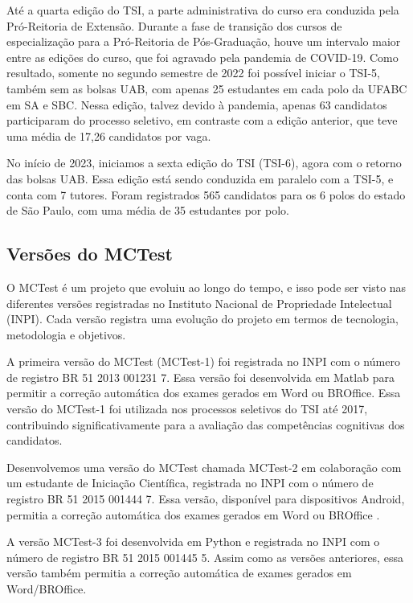 Até a quarta edição do TSI, a parte administrativa do curso era conduzida pela Pró-Reitoria de Extensão. Durante a fase de transição dos cursos de especialização para a Pró-Reitoria de Pós-Graduação, houve um intervalo maior entre as edições do curso, que foi agravado pela pandemia de COVID-19. Como resultado, somente no segundo semestre de 2022 foi possível iniciar o TSI-5, também sem as bolsas UAB, com apenas 25 estudantes em cada polo da UFABC em SA e SBC. Nessa edição, talvez devido à pandemia, apenas 63 candidatos participaram do processo seletivo, em contraste com a edição anterior, que teve uma média de 17,26 candidatos por vaga.

No início de 2023, iniciamos a sexta edição do TSI (TSI-6), agora com o retorno das bolsas UAB. Essa edição está sendo conduzida em paralelo com a TSI-5, e conta com 7 tutores. %
Foram registrados 565 candidatos para os 6 polos do estado de São Paulo, com uma média de 35 estudantes por polo.

\subsection{Versões do MCTest}\label{sec:registrosSoftware}

O MCTest é um projeto que evoluiu ao longo do tempo, e isso pode ser visto nas diferentes versões registradas no Instituto Nacional de Propriedade Intelectual (INPI). Cada versão registra uma evolução do projeto em termos de tecnologia, metodologia e objetivos.

A primeira versão do MCTest (MCTest-1) foi registrada no INPI com o número de registro BR 51 2013 001231 7. Essa versão foi desenvolvida em Matlab para permitir a correção automática dos exames gerados em Word ou BROffice. Essa versão do MCTest-1 foi utilizada nos processos seletivos do TSI até 2017, contribuindo significativamente para a avaliação das competências cognitivas dos candidatos.

Desenvolvemos uma versão do MCTest chamada MCTest-2 em colaboração com um estudante de Iniciação Científica, registrada no INPI com o número de registro BR 51 2015 001444 7. Essa versão, disponível para dispositivos Android, permitia a correção automática dos exames gerados em Word ou BROffice \cite{2014:China.Zampirolli,2015:Zampirolli.China.ea,2016:China.Zampirolli.ea}. 

A versão MCTest-3 foi desenvolvida em Python e registrada no INPI com o número de registro BR 51 2015 001445 5. Assim como as versões anteriores, essa versão também permitia a correção automática de exames gerados em Word/BROffice.

